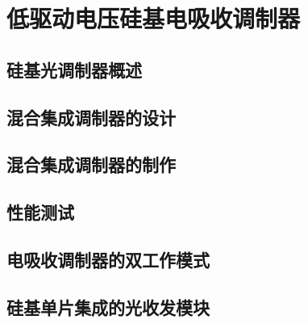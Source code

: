 \chapter{低驱动电压硅基电吸收调制器}
\section{硅基光调制器概述}
\section{混合集成调制器的设计}
\section{混合集成调制器的制作}
\section{性能测试}
\section{电吸收调制器的双工作模式}
\section{硅基单片集成的光收发模块}